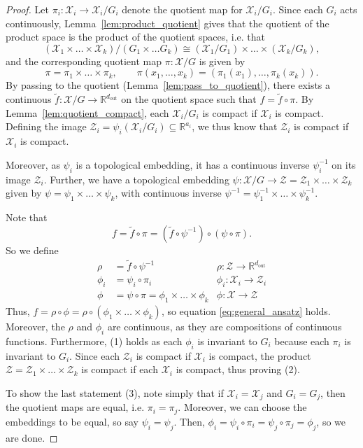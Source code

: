 \documentclass{article} \usepackage{iclr2023_conference,times}
\newcommand{\RR}{\mathbb R}
\newcommand{\mc}[1]{\mathcal{#1}}
\newcommand{\mrm}[1]{\mathrm{#1}}
\newcommand{\dout}{d_{\mrm{out}}}
\begin{document}
\begin{proof}
    Let $\pi_i: \mc X_i \to \mc X_i / G_i$ denote the quotient map for $\mc X_i / G_i$. Since each $G_i$ acts continuously, Lemma~\ref{lem:product_quotient} gives that the quotient of the product space is the product of the quotient spaces, i.e. that
    \begin{equation}
        (\mc X_1 \times \ldots \times \mc X_k) / (G_1 \times \ldots G_k) \cong (\mc X_1 / G_1) \times \ldots \times (\mc X_k / G_k),
    \end{equation}
    and the corresponding quotient map $\pi: \mc X / G$ is given by 
    \begin{equation}
    \pi = \pi_1 \times \ldots \times \pi_k, \qquad \pi(x_1, \ldots, x_k) = (\pi_1(x_1), \ldots, \pi_k(x_k)).
\end{equation}
By passing to the quotient (Lemma~\ref{lem:pass_to_quotient}), there exists a continuous $\tilde f: \mc X /  G \to \RR^{\dout}$ on the quotient space such that $f = \tilde f \circ \pi$. By Lemma~\ref{lem:quotient_compact}, each $\mc X_i / G_i$ is compact if $\mc X_i$ is compact. Defining the image $\mc Z_i =  \psi_i(\mc X_i / G_i) \subseteq \RR^{a_i}$, we thus know that $\mc Z_i$ is compact if $\mc X_i$ is compact. 

Moreover, as $\psi_i$ is a topological embedding, it has a continuous inverse $\psi_i^{-1}$ on its image $\mc Z_i$. Further, we have a topological embedding $\psi: \mc X / G \to \mc Z = \mc Z_1 \times \ldots \times \mc Z_k$ given by $\psi = \psi_1 \times \ldots \times \psi_k$, with continuous inverse $\psi^{-1} = \psi_1^{-1} \times \ldots \times \psi_k^{-1}$.

Note that
\begin{equation}
    f = \tilde f \circ \pi = (\tilde f \circ \psi^{-1}) \circ (\psi \circ \pi).
\end{equation}
So we define
\begin{align}
    \rho & = \tilde f \circ \psi^{-1} & \rho: \mc Z \to \RR^{\dout}\\
    \phi_i & = \psi_i \circ \pi_i & \phi_i: \mc X_i \to \mc Z_i \\
    \phi & = \psi \circ \pi = \phi_1 \times \ldots \times \phi_k & \phi: \mc X \to \mc Z
\end{align}
Thus, $f = \rho \circ \phi = \rho \circ (\phi_1 \times \ldots \times \phi_k)$, so equation \eqref{eq:general_ansatz} holds. Moreover, the $\rho$ and $\phi_i$ are continuous, as they are compositions of continuous functions. Furthermore, (1) holds as each $\phi_i$ is invariant to $G_i$ because each $\pi_i$ is invariant to $G_i$.  Since each $\mc Z_i$ is compact if $\mc X_i$ is compact, the product $\mc Z = \mc Z_1 \times \ldots \times \mc Z_k$ is compact if each $\mc X_i$ is compact, thus proving (2).

To show the last statement (3), note simply that if $\mc X_i = \mc X_j$ and $G_i = G_j$, then the quotient maps are equal, i.e. $\pi_i = \pi_j$. Moreover, we can choose the embeddings to be equal, so say $\psi_i = \psi_j$. Then, $\phi_i = \psi_i \circ \pi_i = \psi_j \circ \pi_j = \phi_j$, so we are done.
\end{proof}
\end{document}
